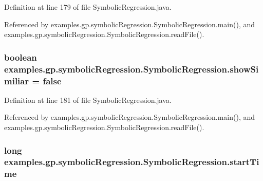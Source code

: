 Definition at line 179 of file Symbolic\-Regression.\-java.



Referenced by examples.\-gp.\-symbolic\-Regression.\-Symbolic\-Regression.\-main(), and examples.\-gp.\-symbolic\-Regression.\-Symbolic\-Regression.\-read\-File().

\hypertarget{classexamples_1_1gp_1_1symbolic_regression_1_1_symbolic_regression_aff693574d91b44b50fcfbacbb8f6714a}{
\subsubsection[{show\-Similiar}]{\setlength{\rightskip}{0pt plus 5cm}boolean examples.\-gp.\-symbolic\-Regression.\-Symbolic\-Regression.\-show\-Similiar = false\hspace{0.3cm}{\ttfamily [static]}}}\label{classexamples_1_1gp_1_1symbolic_regression_1_1_symbolic_regression_aff693574d91b44b50fcfbacbb8f6714a}


Definition at line 181 of file Symbolic\-Regression.\-java.



Referenced by examples.\-gp.\-symbolic\-Regression.\-Symbolic\-Regression.\-main(), and examples.\-gp.\-symbolic\-Regression.\-Symbolic\-Regression.\-read\-File().

\hypertarget{classexamples_1_1gp_1_1symbolic_regression_1_1_symbolic_regression_aaa3d1f6f6f8ef58b3ac3df7d9689246b}{
\subsubsection[{start\-Time}]{\setlength{\rightskip}{0pt plus 5cm}long examples.\-gp.\-symbolic\-Regression.\-Symbolic\-Regression.\-start\-Time\hspace{0.3cm}{\ttfamily [static]}}}\label{classexamples_1_1gp_1_1symbolic_regression_1_1_symbolic_regression_aaa3d1f6f6f8ef58b3ac3df7d9689246b}


